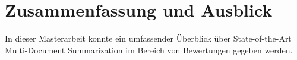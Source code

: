 \section{Zusammenfassung und Ausblick}\raggedbottom
In dieser Masterarbeit konnte ein umfassender Überblick über State-of-the-Art Multi-Document Summarization im Bereich von Bewertungen gegeben werden.


\pagebreak
